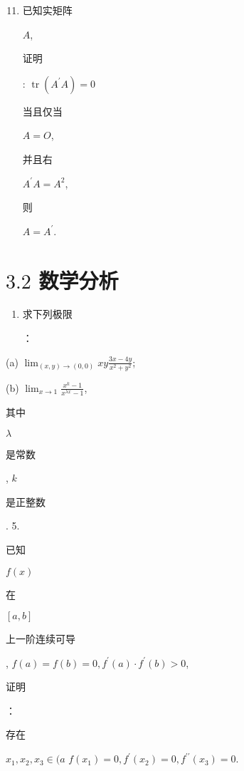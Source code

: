 \documentclass[10pt]{article}
\begin{document}
\begin{enumerate}
  \setcounter{enumi}{10}
  \item \begin{CJK}{UTF8}{mj}已知实矩阵\end{CJK} $A$, \begin{CJK}{UTF8}{mj}证明\end{CJK}: $\operatorname{tr}\left(A^{\prime} A\right)=0$ \begin{CJK}{UTF8}{mj}当且仅当\end{CJK} $A=O$, \begin{CJK}{UTF8}{mj}并且右\end{CJK} $A^{\prime} A=A^{2}$, \begin{CJK}{UTF8}{mj}则\end{CJK} $A=A^{\prime}$.
\end{enumerate}
\section{$3.2$ 数学分析}
\begin{enumerate}
  \item \begin{CJK}{UTF8}{mj}求下列极限\end{CJK}：
\end{enumerate}
(a) $\lim _{(x, y) \rightarrow(0,0)} x y \frac{3 x-4 y}{x^{2}+y^{2}}$;

(b) $\lim _{x \rightarrow 1} \frac{x^{k}-1}{x^{\lambda x}-1}$, \begin{CJK}{UTF8}{mj}其中\end{CJK} $\lambda$ \begin{CJK}{UTF8}{mj}是常数\end{CJK}, $k$ \begin{CJK}{UTF8}{mj}是正整数\end{CJK}. 5. \begin{CJK}{UTF8}{mj}已知\end{CJK} $f(x)$ \begin{CJK}{UTF8}{mj}在\end{CJK} $[a, b]$ \begin{CJK}{UTF8}{mj}上一阶连续可导\end{CJK}, $f(a)=f(b)=0, f^{\prime}(a) \cdot f^{\prime}(b)>0$, \begin{CJK}{UTF8}{mj}证明\end{CJK}：\begin{CJK}{UTF8}{mj}存在\end{CJK} $x_{1}, x_{2}, x_{3} \in(a$ $f\left(x_{1}\right)=0, f^{\prime}\left(x_{2}\right)=0, f^{\prime \prime}\left(x_{3}\right)=0 .$
\end{document}
